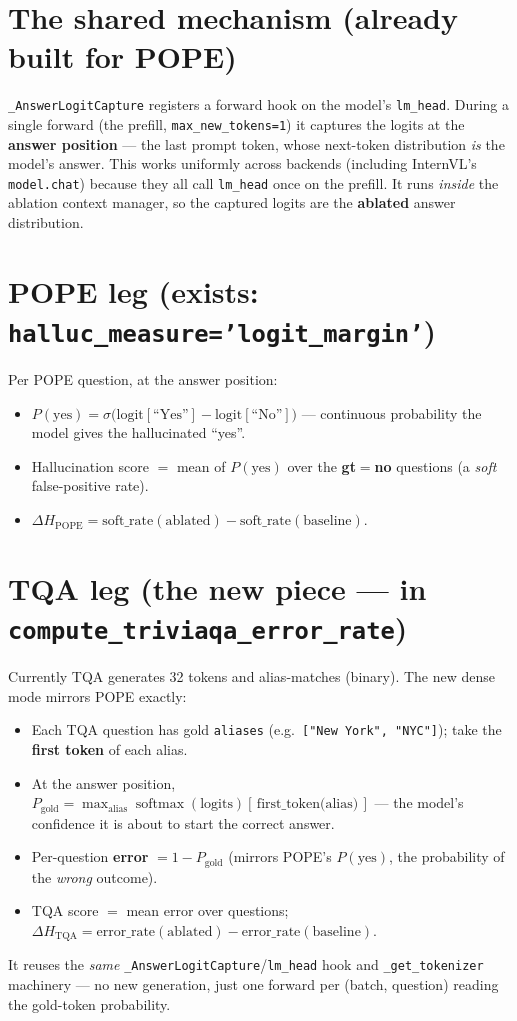 \documentclass[11pt,a4paper]{article}
\newcommand{\code}[1]{\texttt{#1}}
\begin{document}
\section{The shared mechanism (already built for POPE)}
\code{\_AnswerLogitCapture} registers a forward hook on the model's \code{lm\_head}.
During a single forward (the prefill, \code{max\_new\_tokens=1}) it captures the logits
at the \textbf{answer position} --- the last prompt token, whose next-token
distribution \emph{is} the model's answer. This works uniformly across backends
(including InternVL's \code{model.chat}) because they all call \code{lm\_head} once on
the prefill. It runs \emph{inside} the ablation context manager, so the captured logits
are the \textbf{ablated} answer distribution.

\section{POPE leg (exists: \code{halluc\_measure='logit\_margin'})}
Per POPE question, at the answer position:
\begin{itemize}[nosep]
\item $P(\text{yes}) = \sigma\!\big(\text{logit}[\text{``Yes''}] - \text{logit}[\text{``No''}]\big)$ ---
continuous probability the model gives the hallucinated ``yes''.
\item Hallucination score $=$ mean of $P(\text{yes})$ over the \textbf{gt$=$no} questions
(a \emph{soft} false-positive rate).
\item $\Delta H_{\text{POPE}} = \text{soft\_rate}(\text{ablated}) - \text{soft\_rate}(\text{baseline})$.
\end{itemize}

\section{TQA leg (the new piece --- in \code{compute\_triviaqa\_error\_rate})}
Currently TQA generates 32 tokens and alias-matches (binary). The new dense mode mirrors
POPE exactly:
\begin{itemize}[nosep]
\item Each TQA question has gold \code{aliases} (e.g.\ \code{["New York", "NYC"]}); take the
\textbf{first token} of each alias.
\item At the answer position, $P_{\text{gold}} = \max_{\text{alias}}
\operatorname{softmax}(\text{logits})[\,\text{first\_token(alias)}\,]$ --- the model's
confidence it is about to start the correct answer.
\item Per-question \textbf{error} $= 1 - P_{\text{gold}}$ (mirrors POPE's $P(\text{yes})$, the
probability of the \emph{wrong} outcome).
\item TQA score $=$ mean error over questions; $\Delta H_{\text{TQA}} =
\text{error\_rate}(\text{ablated}) - \text{error\_rate}(\text{baseline})$.
\end{itemize}
It reuses the \emph{same} \code{\_AnswerLogitCapture}/\code{lm\_head} hook and
\code{\_get\_tokenizer} machinery --- no new generation, just one forward per
(batch, question) reading the gold-token probability.
\end{document}
